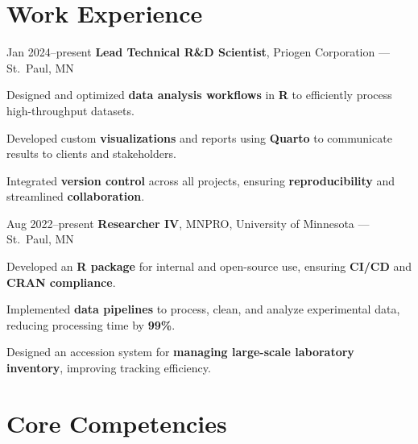 \documentclass{resume}
\begin{document}
    \section{Work Experience}

        \begin{twocolentry}{Jan 2024--present}
            \textbf{Lead Technical R\&D Scientist}, Priogen Corporation --- St.\ Paul, MN
        \end{twocolentry}
        \begin{onecolentry}
            \begin{highlights}
                \item Designed and optimized \textbf{data analysis workflows} in \textbf{R} to efficiently process high-throughput datasets.
                \item Developed custom \textbf{visualizations} and reports using \textbf{Quarto} to communicate results to clients and stakeholders.
                \item Integrated \textbf{version control} across all projects, ensuring \textbf{reproducibility} and streamlined \textbf{collaboration}.
            \end{highlights}
        \end{onecolentry}

        \begin{twocolentry}{Aug 2022--present}
            \textbf{Researcher IV}, MNPRO, University of Minnesota --- St.\ Paul, MN
        \end{twocolentry}
        \begin{onecolentry}
            \begin{highlights}
                \item Developed an \textbf{R package} for internal and open-source use, ensuring \textbf{CI/CD} and \textbf{CRAN compliance}.
                \item Implemented \textbf{data pipelines} to process, clean, and analyze experimental data, reducing processing time by \textbf{99\%}.
                \item Designed an accession system for \textbf{managing large-scale laboratory inventory}, improving tracking efficiency.
            \end{highlights}
        \end{onecolentry}

    
    \section{Core Competencies}
    
\end{document}
